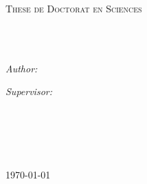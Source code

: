 \documentclass[
12pt, %
english, %
doublespacing,
headsepline, %
]{MastersDoctoralThesis} %
\author{Benameur \textsc{Amiri}} %
\begin{document}
	
	\frontmatter %
	
	\pagestyle{plain} %

\begin{titlepage}
	\begin{center}
		
		\vspace*{.06\textheight}
		{\scshape\LARGE \univname\par}\vspace{1.5cm} %
		\textsc{\Large These de Doctorat en Sciences}\\[0.5cm] %
		
		\HRule \\[0.4cm] %
		{\huge \bfseries \ttitle\par}\vspace{0.4cm} %
		\HRule \\[1.5cm] %
		
		\begin{minipage}[t]{0.4\textwidth}
			\begin{flushleft} \large
				\emph{Author:}\\
				\href{http://www.johnsmith.com}{\authorname} %
			\end{flushleft}
		\end{minipage}
		\begin{minipage}[t]{0.4\textwidth}
			\begin{flushright} \large
				\emph{Supervisor:} \\
				\href{http://www.jamessmith.com}{\supname} %
			\end{flushright}
		\end{minipage}\\[3cm]
		
		\vfill
		
		\groupname\\\deptname\\[2cm] %
		
		\vfill
		
		{\large \today}\\[4cm] %
		
		\vfill
	\end{center}
\end{titlepage}
\end{document}
